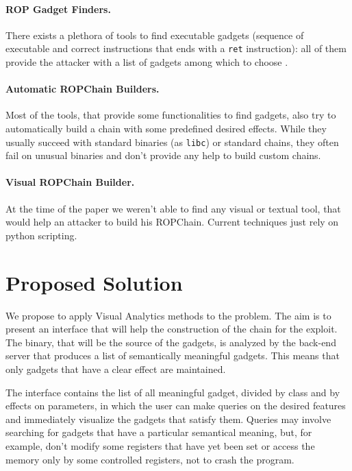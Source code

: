 \documentclass[twocolumn, 11pt]{article}
\begin{document}
\paragraph{ROP Gadget Finders.} There exists a plethora of tools to find executable gadgets (sequence of executable and correct instructions that ends with a {\tt ret} instruction): all of them provide the attacker with a list of gadgets among which to choose \cite{ropper} \cite{ROPGadget}.

\paragraph{Automatic ROPChain Builders.} Most of the tools, that provide some functionalities to find gadgets, also try to automatically build a chain with some predefined desired effects. While they usually succeed with standard binaries (as {\tt libc}) or standard chains, they often fail on unusual binaries and don't provide any help to build custom chains.

\paragraph{Visual ROPChain Builder.} At the time of the paper we weren't able to find any visual or textual tool, that would help an attacker to build his ROPChain. Current techniques just rely on python scripting.

\section{Proposed Solution}

We propose to apply Visual Analytics methods to the problem. The aim is to present an interface that will help the construction of the chain for the exploit.
The binary, that will be the source of the gadgets, is analyzed by the back-end server that produces a list of semantically meaningful gadgets. This means that only gadgets that have a clear effect are maintained.

The interface contains the list of all meaningful gadget, divided by class and by effects on parameters, in which the user can make queries on the desired features and immediately visualize the gadgets that satisfy them.
Queries may involve searching for gadgets that have a particular semantical meaning, but, for example, don't modify some registers that have yet been set or access the memory only by some controlled registers, not to crash the program.
\end{document}
